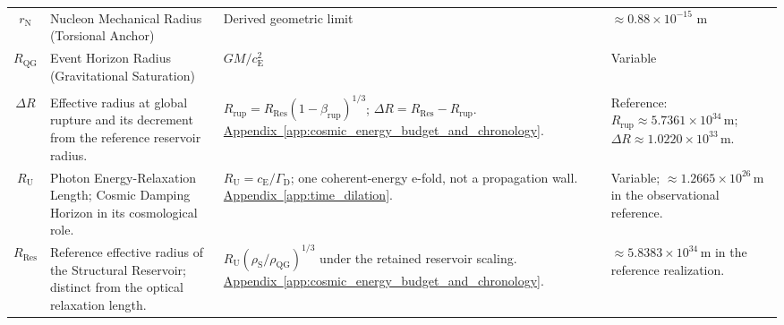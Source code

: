 \begin{longtable}{@{} c p{5.5cm} p{4cm} p{3.5cm} @{}}
$r_{\mathrm{N}}$ & Nucleon Mechanical Radius (Torsional Anchor) & Derived geometric limit & $\approx 0.88 \times 10^{-15}$ m \\

$R_{\mathrm{QG}}$ & Event Horizon Radius (Gravitational Saturation) & $GM / c_{\mathrm{E}}^2$ & Variable \\

\begin{tabular}[c]{@{}c@{}}$R_{\mathrm{rup}}$ \\ $\Delta R$\end{tabular} & {\raggedright Effective radius at global rupture and its decrement from the reference reservoir radius.\par} & {\raggedright $R_{\mathrm{rup}}=R_{\mathrm{Res}}(1-\beta_{\mathrm{rup}})^{1/3}$; $\Delta R=R_{\mathrm{Res}}-R_{\mathrm{rup}}$. \newline \hyperref[app:cosmic_energy_budget_and_chronology]{Appendix~\ref*{app:cosmic_energy_budget_and_chronology}}.\par} & {\raggedright Reference: $R_{\mathrm{rup}}\approx5.7361\times10^{34}\,\mathrm m$; $\Delta R\approx1.0220\times10^{33}\,\mathrm m$.\par} \\


$R_{\mathrm U}$ & {\raggedright Photon Energy-Relaxation Length; Cosmic Damping Horizon in its cosmological role.\par} & {\raggedright $R_{\mathrm U}=c_{\mathrm E}/\Gamma_{\mathrm D}$; one coherent-energy e-fold, not a propagation wall. \newline \hyperref[app:time_dilation]{Appendix~\ref*{app:time_dilation}}.\par} & {\raggedright Variable; $\approx1.2665\times10^{26}\,\mathrm m$ in the observational reference.\par} \\

$R_{\mathrm{Res}}$ & {\raggedright Reference effective radius of the Structural Reservoir; distinct from the optical relaxation length.\par} & {\raggedright $R_{\mathrm U}(\rho_{\mathrm S}/\rho_{\mathrm{QG}})^{1/3}$ under the retained reservoir scaling. \newline \hyperref[app:cosmic_energy_budget_and_chronology]{Appendix~\ref*{app:cosmic_energy_budget_and_chronology}}.\par} & {\raggedright $\approx5.8383\times10^{34}\,\mathrm m$ in the reference realization.\par} \\


\end{longtable}
